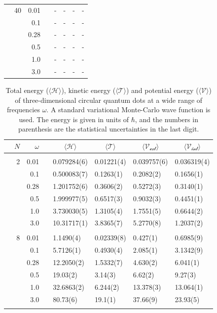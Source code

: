 \begin{table}
\begin{tabularx}{\textwidth}{R{1.5cm}rrcR{2.3cm}R{2.3cm}R{2.3cm}R{2.3cm}}
		&40 & 0.01 && - & - & - & - \\
		&& 0.1 && - & - & - & - \\
		&& 0.28 && - & - & - & - \\
		&& 0.5 && - & - & - & - \\
		&& 1.0 && - & - & - & - \\
		&& 3.0 && - & - & - & - \\ \hline \hline
	\end{tabularx}
\end{table}

\begin{table}
	\caption{Total energy ($\langle \mathcal{H}\rangle$), kinetic energy ($\langle\mathcal{T}\rangle$) and potential energy ($\langle \mathcal{V}\rangle$) of three-dimensional circular quantum dots at a wide range of frequencies $\omega$. A standard variational Monte-Carlo wave function is used. The energy is given in units of $\hbar$, and the numbers in parenthesis are the statistical uncertainties in the last digit.}
	\label{tab:splitfrequencyQDVMC3D}
	\begin{tabularx}{\textwidth}{R{1.5cm}rrcR{2.3cm}R{2.3cm}R{2.3cm}R{2.3cm}} \hline\hline
		& & $\omega$ &&  &  &  &  \\ \hline \\
		&2 & 0.01 && 0.079284(6) & 0.01221(4) & 0.039757(6) & 0.036319(4) \\
		&& 0.1 && 0.500083(7) & 0.1263(1) & 0.2082(2) & 0.1656(1) \\
		&& 0.28 && 1.201752(6) & 0.3606(2) & 0.5272(3) & 0.3140(1) \\
		&& 0.5 && 1.999977(5) & 0.6517(3) & 0.9032(3) & 0.4451(1) \\
		&& 1.0 && 3.730030(5) & 1.3105(4) & 1.7551(5) & 0.6644(2) \\
		&& 3.0 && 10.31717(1) & 3.8365(7) & 5.2770(8) & 1.2037(2) \\ \hdashline \\
		
		&8 & 0.01 && 1.1490(4) & 0.02339(8) & 0.427(1) & 0.6985(9) \\
		&& 0.1 && 5.7126(1) & 0.4930(4) & 2.085(1) & 3.1342(9) \\
		&& 0.28 && 12.2050(2) & 1.5332(7) & 4.630(2) & 6.041(1) \\
		&& 0.5 && 19.03(2) & 3.14(3) & 6.62(2) & 9.27(3) \\
		&& 1.0 && 32.6863(2) & 6.244(2) & 13.378(3) & 13.064(1) \\
		&& 3.0 && 80.73(6) & 19.1(1) & 37.66(9) & 23.93(5) \\ \hdashline \\
		

\end{tabularx}
\end{table}
